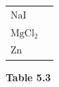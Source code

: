 \begin{enumerate}[noitemsep, label=\textbf{\arabic*}. ]
{{\begin{center}
\begin{xtabular}[t]{|l|l|}
     \tabularnewline{}
    
    
        \begin{math}\mathrm{NaI}\end{math} &
    
    
     \tabularnewline{}
    
    
        \begin{math}\mathrm{MgCl}{}_{2}\end{math} &
    
    
     \tabularnewline{}
    
    
        \begin{math}\mathrm{Zn}\end{math} &
    
    
     \tabularnewline{}
    \end{xtabular}
      \end{center}
    \begin{center}{\small\bfseries Table 5.3}\end{center}
    
}}
\end{enumerate}
